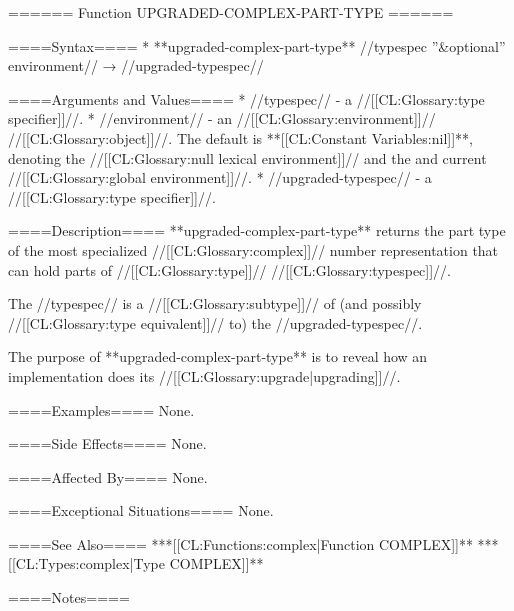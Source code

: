 ====== Function UPGRADED-COMPLEX-PART-TYPE ======

====Syntax====
  * **upgraded-complex-part-type** //typespec ''&optional'' environment// → //upgraded-typespec//

====Arguments and Values====
  * //typespec// - a //[[CL:Glossary:type specifier]]//.
  * //environment// - an //[[CL:Glossary:environment]]// //[[CL:Glossary:object]]//. The default is **[[CL:Constant Variables:nil]]**, denoting the //[[CL:Glossary:null lexical environment]]// and the and current //[[CL:Glossary:global environment]]//.
  * //upgraded-typespec// - a //[[CL:Glossary:type specifier]]//.

====Description====
**upgraded-complex-part-type** returns the part type of the most specialized //[[CL:Glossary:complex]]// number representation that can hold parts of //[[CL:Glossary:type]]// //[[CL:Glossary:typespec]]//.

The //typespec// is a //[[CL:Glossary:subtype]]// of (and possibly //[[CL:Glossary:type equivalent]]// to) the //upgraded-typespec//.

The purpose of **upgraded-complex-part-type** is to reveal how an implementation does its //[[CL:Glossary:upgrade|upgrading]]//.

====Examples====
None.

====Side Effects====
None.

====Affected By====
None.

====Exceptional Situations====
None.

====See Also====
  ***[[CL:Functions:complex|Function COMPLEX]]**
  ***[[CL:Types:complex|Type COMPLEX]]**

====Notes====

 
